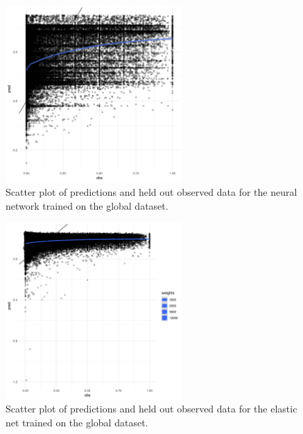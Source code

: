 \documentclass[review]{elsarticle}
\begin{document}
\begin{figure}[h!]
  \centering
  \includegraphics[width=0.6\textwidth]{figs/SI/nnet_obspred_global.png}
\caption{
  Scatter plot of predictions and held out observed data for the neural network trained on the global dataset.
}

\end{figure}



\begin{figure}[h!]
  \centering
  \includegraphics[width=0.6\textwidth]{figs/SI/enet_obspred_global.png}
\caption{
  Scatter plot of predictions and held out observed data for the elastic net trained on the global dataset.
}

\end{figure}
\end{document}
